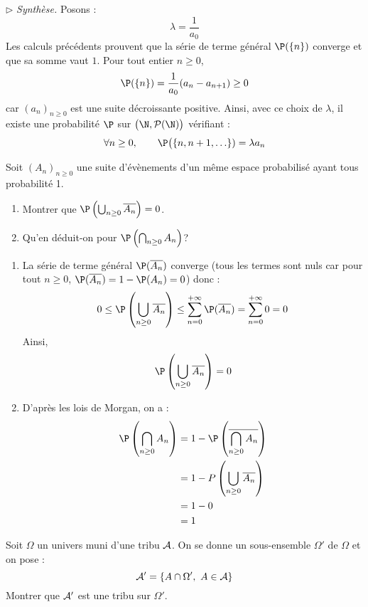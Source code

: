 \documentclass[a4paper,10pt]{report}
\begin{document}
\medskip

\noindent $\rhd$ \textit{Synthèse.} Posons :
$$ \lambda = \dfrac{1}{a_0}$$
Les calculs précédents prouvent que la série de terme général $\P( \lbrace n \rbrace)$ converge et que sa somme vaut $1$. Pour tout entier $n \geq 0$,
$$ \P( \lbrace n \rbrace) = \dfrac{1}{a_0} (a_n - a_{n+1}) \geq 0$$
car $(a_n)_{n \geq 0}$ est une suite décroissante positive. Ainsi, avec ce choix de $\lambda$, il existe une probabilité $\P$ sur $\bigl(\N,\mathcal{P}(\N)\bigr)$ vérifiant :
    \[
    \forall n \geq 0, \qquad \P\bigl( \lbrace n, n+1, \ldots \rbrace) = \lambda a_n
    \]
    
\begin{Exa} Soit $(A_n)_{n \geq 0}$ une suite d'évènements d'un même espace probabilisé ayant tous probabilité 1. 
 
 \begin{enumerate}
 \item Montrer que $\P \left( \bigcup_{n \geq 0} \overline{A_n} \right) = 0$.
 \item Qu'en déduit-on pour $\P \left( \bigcap_{n \geq 0} A_n \right)$?
 \end{enumerate}
 \end{Exa}
 
 \corr 
 
 \begin{enumerate}
 \item La série de terme général $\P( \overline{A_n})$ converge (tous les termes sont nuls car pour tout $n \geq 0$, $\P( \overline{A_n})= 1- \P(A_n)=0$) donc :
 $$ 0 \leq \P \left( \bigcup_{n \geq 0} \overline{A_n} \right) \leq \sum_{n=0}^{+ \infty} \P( \overline{A_n})  = \sum_{n=0}^{+ \infty} 0 = 0$$
 Ainsi,
 $$ \P \left( \bigcup_{n \geq 0} \overline{A_n} \right)=0$$
 \item D'après les lois de Morgan, on a :
 \begin{align*}
 \P \left( \bigcap_{n \geq 0} A_n \right) & = 1 - \P \left( \overline{\bigcap_{n \geq 0} A_n} \right) \\
 &= 1 - P \left( \bigcup_{n \geq 0} \overline{A_n} \right) \\
 & =1-0 \\
 & = 1
 \end{align*}
 \end{enumerate}
 
 
\begin{Exa} Soit $\Omega$ un univers muni d'une tribu ${\cal A}$. On se donne un sous-ensemble $\Omega'$ de $\Omega$ et on pose :
 $${\cal A}'=\{A\cap \Omega',\ A\in{\cal A}\}$$
Montrer que ${\cal A}'$ est une tribu sur $\Omega'.$
\end{Exa}
\end{document}
